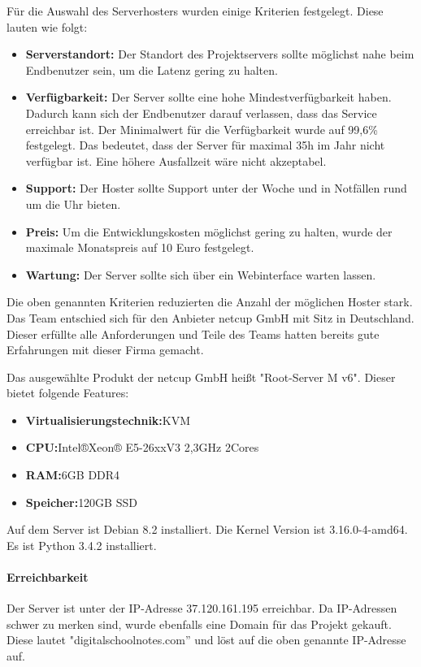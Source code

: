 Für die Auswahl des Serverhosters wurden einige Kriterien festgelegt. Diese lauten wie folgt:
\begin{itemize}
\item \textbf{Serverstandort:} Der Standort des Projektservers sollte möglichst nahe beim Endbenutzer sein, um die \gls{Latenz} gering zu halten.
\item \textbf{Verfügbarkeit:} Der Server sollte eine hohe Mindestverfügbarkeit haben. Dadurch kann sich der Endbenutzer darauf verlassen, dass das Service erreichbar ist. Der Minimalwert für die Verfügbarkeit wurde auf 99,6\% festgelegt. Das bedeutet, dass der Server für maximal 35h im Jahr nicht verfügbar ist. Eine höhere Ausfallzeit wäre nicht akzeptabel.
\item \textbf{Support:} Der Hoster sollte Support unter der Woche und in Notfällen rund um die Uhr bieten.
\item \textbf{Preis:} Um die Entwicklungskosten möglichst gering zu halten, wurde der maximale Monatspreis auf 10 Euro festgelegt.
\item \textbf{Wartung:} Der Server sollte sich über ein Webinterface warten lassen.
\end{itemize}

Die oben genannten Kriterien reduzierten die Anzahl der möglichen Hoster stark. Das Team entschied sich für den Anbieter netcup GmbH mit Sitz in Deutschland. Dieser erfüllte alle Anforderungen und Teile des Teams hatten bereits gute Erfahrungen mit dieser Firma gemacht.

Das ausgewählte Produkt der netcup GmbH heißt "Root-Server M v6". Dieser bietet folgende Features:
\begin{itemize}
\item \textbf{Virtualisierungstechnik:}\gls{KVM}
\item \textbf{CPU:}Intel®Xeon® E5-26xxV3 2,3GHz 2Cores
\item \textbf{RAM:}6GB DDR4
\item \textbf{Speicher:}120GB SSD
\end{itemize}

Auf dem Server ist Debian 8.2 installiert. Die Kernel Version ist 3.16.0-4-amd64. Es ist Python 3.4.2 installiert. 

\paragraph{Erreichbarkeit}
Der Server ist unter der IP-Adresse 37.120.161.195 erreichbar. Da IP-Adressen schwer zu merken sind, wurde ebenfalls eine Domain für das Projekt gekauft. Diese lautet "digitalschoolnotes.com'' und löst auf die oben genannte IP-Adresse auf.

